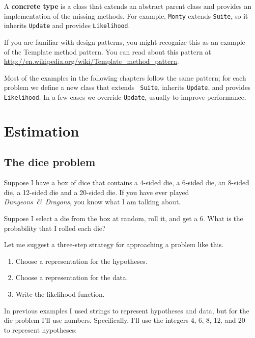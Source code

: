 \documentclass[12pt]{book}
\begin{document}
A {\bf concrete type} is a class that extends an abstract parent
class and provides an implementation of the missing methods.
For example, {\tt Monty} extends {\tt Suite}, so it inherits
{\tt Update} and provides {\tt Likelihood}.

If you are familiar with
design patterns, you might recognize this as an example of the
Template method pattern.
You can read about this pattern at
\url{http://en.wikipedia.org/wiki/Template_method_pattern}.

Most of the examples in the following chapters follow the same
pattern; for each problem we define a new class that extends {\tt
  Suite}, inherits {\tt Update}, and provides {\tt Likelihood}.  In a
few cases we override {\tt Update}, usually to improve performance.



\chapter{Estimation}
\label{estimation}

\section{The dice problem}

Suppose I have a box of dice that contains a 4-sided die, a 6-sided
die, an 8-sided die, a 12-sided die and a 20-sided die.  If you
have ever played {\it Dungeons~\&~Dragons}, you know what I am talking about.

Suppose I select a die from the box at random, roll it, and get a 6.
What is the probability that I rolled each die?

Let me suggest a three-step strategy for approaching a problem like this.

\begin{enumerate}

\item Choose a representation for the hypotheses.

\item Choose a representation for the data.

\item Write the likelihood function.

\end{enumerate}

In previous examples I used strings to represent hypotheses and
data, but for the die problem I'll use numbers.  Specifically,
I'll use the integers 4, 6, 8, 12, and 20 to represent hypotheses:
\end{document}
